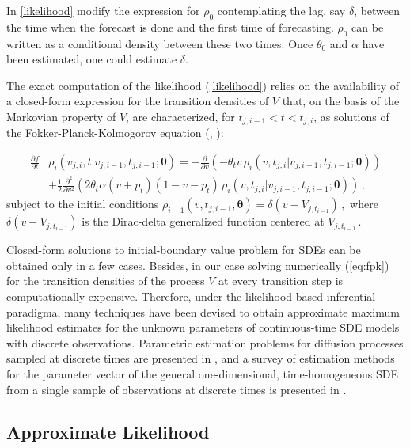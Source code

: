 \documentclass[11pt]{article}
\begin{document}
 {\color{red} In \ref{likelihood} modify the expression for $\rho_0$ contemplating the lag, say $\delta$, between the time when the forecast is done and the first time of forecasting. $\rho_0$ can be written as a conditional density between these two times. Once $\theta_0$ and $\alpha$ have been estimated, one could estimate $\delta$.}

The exact computation of the likelihood (\ref{likelihood}) relies on the availability of a closed-form expression for the transition densities of $V$ that, on the basis of the Markovian property of $V$, are characterized, for $ t_{j, i-1} < t < t_{j,i}$,  as solutions of the Fokker-Planck-Kolmogorov equation (\cite[36]{iacus1}, \cite[61-68]{saso}):

\begin{align}
\frac{ \partial f }{\partial t } & \rho_i(v_{j,i} ,t \vert v_{j,i-1} ,  t_{j,i-1} ; \bm{\theta} )= - \frac{\partial}{ \partial v} (- \theta_t v \, \rho_i(v ,t_{j,i} \vert v_{j,i-1} ,  t_{j,i-1} ; \bm{\theta} ) ) \nonumber \\
& + \frac{1}{2} \frac{\partial^2}{ \partial v^2} ( 2 \theta_t \alpha (v+ p_t) (1 - v- p_t) \, \rho_i(v ,t_{j,i} \vert v_{j,i-1} ,  t_{j,i-1} ; \bm{\theta} ) )\,,  \label{eq:fpk}
\end{align}
subject to the initial conditions $\rho_{i-1}(v , t_{j, i-1} , \bm{\theta} ) = \delta(v - V_{j, t_{i-1}}) \,,$ where $ \delta(v - V_{j, t_{i-1}})$ is the Dirac-delta generalized function centered at $ V_{j, t_{i-1}}\,.$

Closed-form solutions to initial-boundary value problem for SDEs can be obtained only in a few cases. Besides, in our case solving numerically (\ref{eq:fpk}) for the transition densities of the process $V$ at every transition step is computationally expensive. 
Therefore, under the likelihood-based inferential paradigma, many techniques have been devised to obtain approximate maximum likelihood estimates for the unknown parameters of continuous-time SDE models with discrete observations. Parametric estimation problems for diffusion processes sampled at discrete times are presented in \autocite[Chapter 3]{iacus1}, and a survey of estimation methods for the parameter vector of the general one-dimensional, time-homogeneous SDE from a single sample of observations at discrete times is presented in \autocite{hurn}.

\subsection{Approximate Likelihood}
\end{document}
